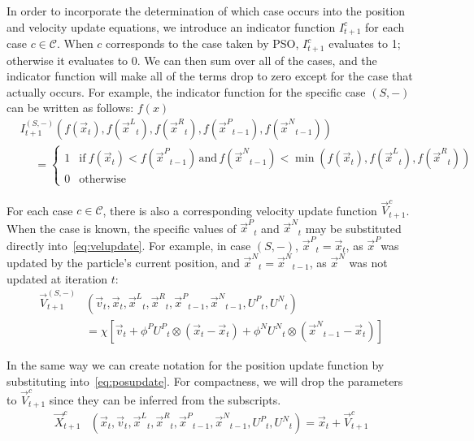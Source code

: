 \documentclass{llncs}
\newcommand{\parens}[1]{\!\left(#1\right)}
\providecommand{\pers}{\ensuremath{P}}
\providecommand{\neigh}{\ensuremath{N}}
\providecommand{\leftind}{\ensuremath{L}}
\providecommand{\rightind}{\ensuremath{R}}
\providecommand{\nURand}{\ensuremath{U^\neigh}}
\providecommand{\pURand}{\ensuremath{U^\pers}}
\providecommand{\ppos}{\ensuremath{\Vec{x}}}
\providecommand{\pvel}{\ensuremath{\Vec{v}}}
\providecommand{\nbest}{\ensuremath{\Vec{x}^\neigh}}
\providecommand{\pbest}{\ensuremath{\Vec{x}^\pers}}
\providecommand{\constriction}{\ensuremath{\chi}}
\providecommand{\ncoeff}{\ensuremath{\phi^\neigh}}
\providecommand{\pcoeff}{\ensuremath{\phi^\pers}}
\providecommand{\ofunc}{\ensuremath{f}}
\providecommand{\indic}{\ensuremath{I}}
\providecommand{\specvel}{\ensuremath{\vec{V}}}
\providecommand{\specpos}{\ensuremath{\vec{X}}}
\providecommand{\leftn}{\ensuremath{\Vec{x}^\leftind}}
\providecommand{\rightn}{\ensuremath{\Vec{x}^\rightind}}
\providecommand{\caseset}{\ensuremath{\mathcal{C}}}
\providecommand{\casegen}{\ensuremath{c}}
\providecommand{\casexn}{\ensuremath{(S,-)}}
\begin{document}
In order to incorporate the determination of which case occurs into the
position and velocity update equations, we introduce an indicator function
$\indic_{t+1}^{\casegen}$ for each case $\casegen \in \caseset$.  When
$\casegen$ corresponds to the case taken by PSO,
$\indic_{t+1}^{\casegen}$ evaluates to 1; otherwise it evaluates to 0.  We can
then sum over all of the cases, and the indicator function will make all of the
terms drop to zero except for the case that actually occurs.  For example, the
indicator function for the specific case $\casexn$ can be written as follows:
$f(x)$
\begin{align}
  \nonumber
	&\indic_{t+1}^{\casexn}\parens{
	  \ofunc\parens{\ppos_{t}},
	  \ofunc\parens{\leftn_{t}},
	  \ofunc\parens{\rightn_{t}},
	  \ofunc\parens{\pbest_{t-1}},
	  \ofunc\parens{\nbest_{t-1}}
	  } \\
  &\hspace{15pt}= \label{eq:deficasexn}
	\begin{cases}
	  1 & \text{if}~
		\ofunc\parens{\ppos_{t}} < \ofunc\parens{\pbest_{t-1}}
	    \,\text{and}\,
		\ofunc\parens{\nbest_{t-1}} < \min\parens{
		  \ofunc\parens{\ppos_{t}},
		  \ofunc\parens{\leftn_{t}},
		  \ofunc\parens{\rightn_{t}}
		} \\
	   0 & \text{otherwise}
	\end{cases}
\end{align}

For each case $\casegen \in \caseset$, there is also a corresponding
velocity update function $\specvel_{t+1}^{\casegen}$.  When the case is
known, the specific values of $\pbest_t$ and $\nbest_t$ may be substituted
directly into~\eqref{eq:velupdate}.  For example, in case $\casexn$,
$\pbest_{t}=\ppos_{t}$, as \pbest was updated by the particle's current
position, and $\nbest_{t}=\nbest_{t-1}$, as $\nbest$ was not updated at
iteration $t$:
\begin{align}
\nonumber
	\specvel_{t+1}^{\casexn} & \parens{\pvel_t, \ppos_{t}, \leftn_{t}, \rightn_{t},
	\pbest_{t-1}, \nbest_{t-1}, \pURand_{t}, \nURand_{t}} \\
\label{eq:defvcasexn}
		&= \constriction \left[ \pvel_{t} +
			\pcoeff\pURand_{t}\otimes\parens{\ppos_{t} - \ppos_{t}}
			+ \ncoeff\nURand_{t}\otimes\parens{\nbest_{t-1} -
			\ppos_{t}} \right]
\end{align}

In the same way we can create notation for the position update function by
substituting into~\eqref{eq:posupdate}.  For compactness, we will drop the
parameters to $\specvel_{t+1}^{\casegen}$ since they can be inferred from the
subscripts.
\begin{align}
\label{eq:defpcasegen}
	\specpos_{t+1}^{\casegen} & \parens{\ppos_{t}, \pvel_{t}, \leftn_{t},
	\rightn_{t} ,\pbest_{t-1} ,\nbest_{t-1}, \pURand_{t}, \nURand_{t}}
	 = \ppos_{t} + \specvel_{t+1}^{\casegen}
\end{align}
\end{document}
